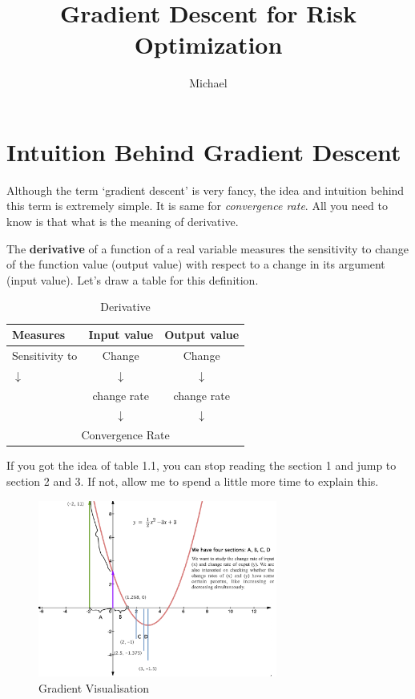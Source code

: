 \documentclass[12pt]{article}
\theoremstyle{definition}
\numberwithin{equation}{section}
\numberwithin{figure}{section}
\numberwithin{table}{section}
\begin{document}
\title{Gradient Descent for Risk Optimization}
\author{Michael}
\date{}
\maketitle

\section{Intuition Behind Gradient Descent}

Although the term `gradient descent' is very fancy, the idea and intuition behind this term is extremely simple. It is same for \textit{convergence rate}. All you need to know is that what is the meaning of derivative.

The \textbf{derivative} of a function of a real variable measures the sensitivity to change of the function value (output value) with respect to a change in its argument (input value). Let's draw a table for this definition.
\begin{table}[H]
  \centering
  \caption{Derivative}
  \begin{tabular}{lcc}
    \hline
    Measures & Input value & Output value \\
    \hline
    Sensitivity to & Change & Change \\
    \hline
    $\downarrow$ & $\downarrow$ & $\downarrow$ \\
    & change rate & change rate \\
    & $\downarrow$ & $\downarrow$ \\
    \hline
    \multicolumn{3}{c}{Convergence Rate} \\
    \hline
  \end{tabular}
\end{table}

If you got the idea of table 1.1, you can stop reading the section 1 and jump to section 2 and 3. If not, allow me to spend a little more time to explain this.
\begin{figure}[H]
  \centering
  \includegraphics[width=0.7\textwidth]{gradientEg}
  \caption{Gradient Visualisation}
\end{figure}
\end{document}
